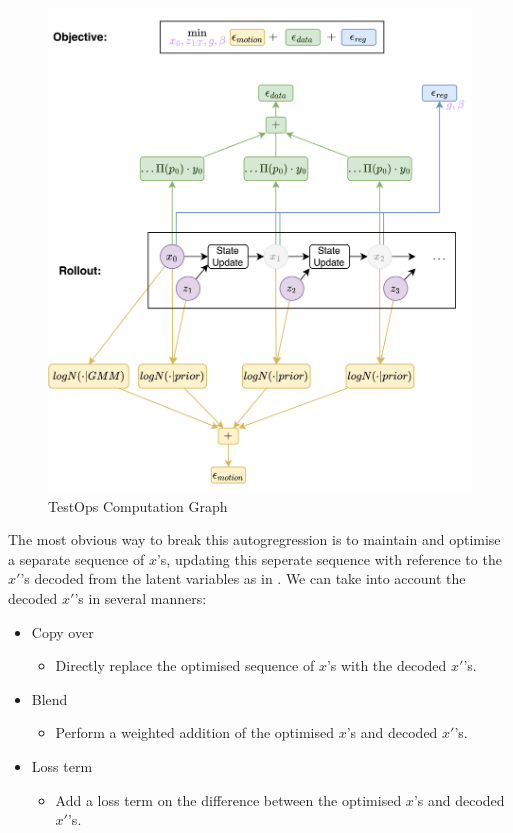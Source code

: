 \begin{figure}[!ht]
    \centering
    \includegraphics[width=1\textwidth]{Figures/humor/improvement/computation_graph_humor.png}
    \caption{TestOps Computation Graph}
    \label{fig:humor_rollout_graph}
\end{figure}


The most obvious way to break this autogregression is to maintain and optimise a separate sequence of $x$'s, updating this seperate sequence with reference to the $x'$'s decoded from the latent variables as in . We can take into account the decoded $x'$'s in several manners:
\begin{itemize}
    \item Copy over
    \begin{itemize}
        \item Directly replace the optimised sequence of $x$'s with the decoded $x'$'s.
    \end{itemize}
    \item Blend
    \begin{itemize}
        \item Perform a weighted addition of the optimised $x$'s and decoded $x'$'s.
    \end{itemize}
    \item Loss term
    \begin{itemize}
        \item Add a loss term on the difference between the optimised $x$'s and decoded $x'$'s. 
    \end{itemize}
\end{itemize}

